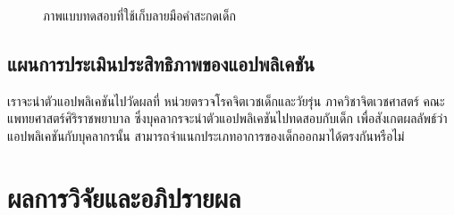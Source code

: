 \documentclass[12pt,oneside,openright,a4paper]{cpe-thai-project}
\begin{document}
\begin{figure}[!ht]\centering
  \setlength{\fboxrule}{0.2mm} %
  \setlength{\fboxsep}{1cm}
  \caption{ภาพแบบทดสอบที่ใช้เก็บลายมือคำสะกดเด็ก}\label{fig:system}
    
\end{figure}

\newpage
\section{แผนการประเมินประสิทธิภาพของแอปพลิเคชัน}
เราจะนำตัวแอปพลิเคชันไปวัดผลที่ หน่วยตรวจโรคจิตเวชเด็กและวัยรุ่น ภาควิชาจิตเวชศาสตร์ คณะแพทยศาสตร์ศิริราชพยาบาล  ซึ่งบุคลากรจะนำตัวแอปพลิเคชันไปทดสอบกับเด็ก เพื่อสังเกตผลลัพธ์ว่า แอปพลิเคชันกับบุคลากรนั้น สามารถจำแนกประเภทอาการของเด็กออกมาได้ตรงกันหรือไม่ 

\chapter{ผลการวิจัยและอภิปรายผล}
\end{document}
